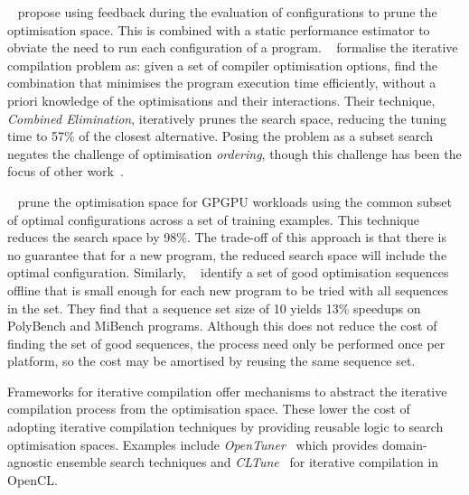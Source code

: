 \citeauthor{Triantafyllis2003}~\cite{Triantafyllis2003} propose using feedback during the evaluation of configurations to prune the optimisation space. This is combined with a static performance estimator to obviate the need to run each configuration of a program. \citeauthor{Pan2006}~\cite{Pan2006} formalise the iterative compilation problem as: given a set of compiler optimisation options, find the combination that minimises the program execution time efficiently, without a priori knowledge of the optimisations and their interactions. Their technique, \emph{Combined Elimination}, iteratively prunes the search space, reducing the tuning time to 57\% of the closest alternative. Posing the problem as a subset search negates the challenge of optimisation \emph{ordering}, though this challenge has been the focus of other work~\cite{Kulkarni2012,Purini2013}.

\citeauthor{Ryoo2008}~\cite{Ryoo2008} prune the optimisation space for GPGPU workloads using the common subset of optimal configurations across a set of training examples. This technique reduces the search space by 98\%. The trade-off of this approach is that there is no guarantee that for a new program, the reduced search space will include the optimal configuration. Similarly, \citeauthor{Purini2013}~\cite{Purini2013} identify a set of good optimisation sequences offline that is small enough for each new program to be tried with all sequences in the set. They find that a sequence set size of 10 yields 13\% speedups on PolyBench and MiBench programs. Although this does not reduce the cost of finding the set of good sequences, the process need only be performed once per platform, so the cost may be amortised by reusing the same sequence set.

Frameworks for iterative compilation offer mechanisms to abstract the iterative compilation process from the optimisation space. These lower the cost of adopting iterative compilation techniques by providing reusable logic to search optimisation spaces. Examples include \emph{OpenTuner}~\cite{Ansel2013} which provides domain-agnostic ensemble search techniques and \emph{CLTune}~\cite{Nugteren2015} for iterative compilation in OpenCL.

